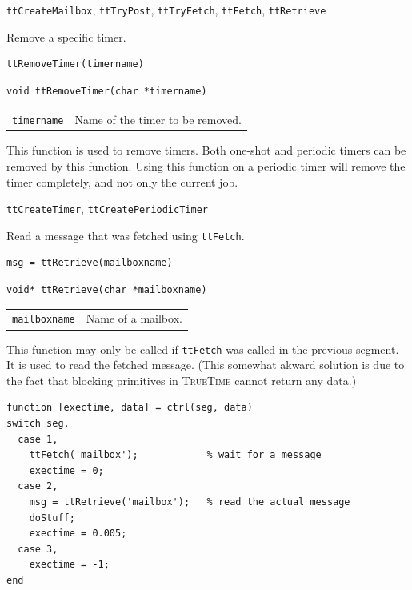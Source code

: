 \documentclass[final,twoside]{rapport}
\begin{document}
\seealso
{\tt ttCreateMailbox}, {\tt ttTryPost}, {\tt ttTryFetch}, 
{\tt ttFetch}, {\tt ttRetrieve}




\purpose
Remove a specific timer.

\Msyntax
\begin{verbatim}
ttRemoveTimer(timername)
\end{verbatim}

\Csyntax
\begin{verbatim}
void ttRemoveTimer(char *timername)
\end{verbatim}

\args
\begin{tabularx}{\hsize}{l>{\raggedright\arraybackslash}X}
  {\tt timername} & Name of the timer to be removed. 
\end{tabularx}

\descr This function is used to remove timers. Both one-shot and
periodic timers can be removed by this function. Using this function
on a periodic timer will remove the timer completely, and not only the
current job.

\seealso
{\tt ttCreateTimer}, {\tt ttCreatePeriodicTimer}



\purpose
Read a message that was fetched using {\tt ttFetch}.

\Msyntax
\begin{verbatim}
msg = ttRetrieve(mailboxname) 
\end{verbatim}

\Csyntax
\begin{verbatim}
void* ttRetrieve(char *mailboxname) 
\end{verbatim}

\args
\begin{tabularx}{\hsize}{l>{\raggedright\arraybackslash}X}
  {\tt mailboxname} & Name of a mailbox.
\end{tabularx}

\descr This function may only be called if {\tt ttFetch} was called in
the previous segment. It is used to read the fetched message. (This
somewhat akward solution is due to the fact that blocking primitives
in \textsc{TrueTime} cannot return any data.)

\example 
\begin{small}
\begin{verbatim}
function [exectime, data] = ctrl(seg, data)
switch seg,
  case 1, 
    ttFetch('mailbox');            % wait for a message
    exectime = 0;
  case 2,
    msg = ttRetrieve('mailbox');   % read the actual message
    doStuff;
    exectime = 0.005;
  case 3,
    exectime = -1;
end
\end{verbatim}
\end{small}
\end{document}
